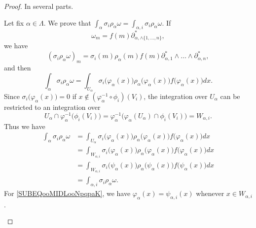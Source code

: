 \begin{proof}
	In several parts.
	\begin{subproof}
		Let fix \( \alpha\in \Lambda\). We prove that \( \int_{\alpha}\sigma_i\rho_{\alpha}\omega=\int_{\alpha,i}\sigma_i\rho_{\alpha}\omega\). If
		\begin{equation}
			\omega_m=f(m)\partial^*_{\alpha,\wedge\{ 1,\ldots,n \}},
		\end{equation}
		we have
		\begin{equation}
			(\sigma_i\rho_{\alpha}\omega)_m=\sigma_i(m)\rho_{\alpha}(m)f(m)  \partial^*_{\alpha,1}\wedge\ldots\wedge\partial^*_{\alpha,n},
		\end{equation}
		and then
		\begin{equation}
			\int_{\alpha}\sigma_i\rho_{\alpha}\omega=\int_{U_{\alpha}}\sigma_i\big( \varphi_{\alpha}(x) \big)\rho_{\alpha}\big( \varphi_{\alpha}(x) \big)f\big( \varphi_{\alpha}(x) \big)dx.
		\end{equation}
		Since \( \sigma_i\big( \varphi_{\alpha}(x) \big)=0\) if \( x\not\in(\varphi_{\alpha}^{-1}\circ\phi_i)(V_i)\), the integration over \( U_{\alpha}\) can be restricted to an integration over
		\begin{equation}
			U_{\alpha}\cap\varphi_{\alpha}^{-1}\big( \phi_i(V_i) \big)=\varphi_{\alpha}^{-1}\big( \varphi_{\alpha}(U_{\alpha})\cap\phi_i(V_i) \big)=W_{\alpha,i}.
		\end{equation}
		Thus we have
		\begin{subequations}
			\begin{align}
				\int_{\alpha}\sigma_i\rho_{\alpha}\omega & =\int_{U_{\alpha}}\sigma_i\big( \varphi_{\alpha}(x) \big)\rho_{\alpha}\big( \varphi_{\alpha}(x) \big)f\big( \varphi_{\alpha}(x) \big)dx                                \\
				                                         & =\int_{W_{\alpha,i}}\sigma_i\big( \varphi_{\alpha}(x) \big)\rho_{\alpha}\big( \varphi_{\alpha}(x) \big)f\big( \varphi_{\alpha}(x) \big)dx                              \\
				                                         & =\int_{W_{\alpha,i}}\sigma_i\big( \psi_{\alpha}(x) \big)\rho_{\alpha}\big( \psi_{\alpha}(x) \big)f\big( \psi_{\alpha}(x) \big)dx           \label{SUBEQooMIDLooNpqpaK} \\
				                                         & = \int_{\alpha,i}\sigma_i\rho_{\alpha}\omega.
			\end{align}
		\end{subequations}
		For \eqref{SUBEQooMIDLooNpqpaK}, we have \( \varphi_{\alpha}(x)=\psi_{\alpha,i}(x)\) whenever \( x\in W_{\alpha,i}\).


\end{subproof}
\end{proof}
